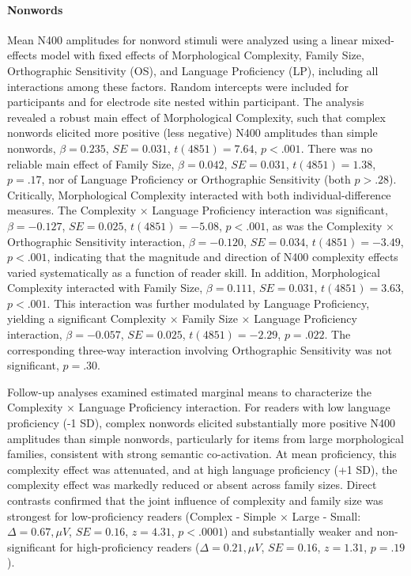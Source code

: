 \documentclass[preprint,12pt, authoryear, review]{elsarticle}
\begin{document}
	\paragraph*{Nonwords}
	Mean N400 amplitudes for nonword stimuli were analyzed using a linear mixed-effects model with fixed effects of Morphological Complexity, Family Size, Orthographic Sensitivity (OS), and Language Proficiency (LP), including all interactions among these factors. Random intercepts were included for participants and for electrode site nested within participant. The analysis revealed a robust main effect of Morphological Complexity, such that complex nonwords elicited more positive (less negative) N400 amplitudes than simple nonwords, $\beta = 0.235$, $SE = 0.031$, $t(4851) = 7.64$, $p < .001$. There was no reliable main effect of Family Size, $\beta = 0.042$, $SE = 0.031$, $t(4851) = 1.38$, $p = .17$, nor of Language Proficiency or Orthographic Sensitivity (both $p > .28$). Critically, Morphological Complexity interacted with both individual-difference measures. The Complexity × Language Proficiency interaction was significant, $\beta = -0.127$, $SE = 0.025$, $t(4851) = -5.08$, $p < .001$, as was the Complexity × Orthographic Sensitivity interaction, $\beta = -0.120$, $SE = 0.034$, $t(4851) = -3.49$, $p < .001$, indicating that the magnitude and direction of N400 complexity effects varied systematically as a function of reader skill. In addition, Morphological Complexity interacted with Family Size, $\beta = 0.111$, $SE = 0.031$, $t(4851) = 3.63$, $p < .001$. This interaction was further modulated by Language Proficiency, yielding a significant Complexity × Family Size × Language Proficiency interaction, $\beta = -0.057$, $SE = 0.025$, $t(4851) = -2.29$, $p = .022$. The corresponding three-way interaction involving Orthographic Sensitivity was not significant, $p = .30$.
	
	Follow-up analyses examined estimated marginal means to characterize the Complexity × Language Proficiency interaction. For readers with low language proficiency (-1 SD), complex nonwords elicited substantially more positive N400 amplitudes than simple nonwords, particularly for items from large morphological families, consistent with strong semantic co-activation. At mean proficiency, this complexity effect was attenuated, and at high language proficiency (+1 SD), the complexity effect was markedly reduced or absent across family sizes. Direct contrasts confirmed that the joint influence of complexity and family size was strongest for low-proficiency readers (Complex - Simple × Large - Small: $\Delta = 0.67,\mu V$, $SE = 0.16$, $z = 4.31$, $p < .0001$) and substantially weaker and non-significant for high-proficiency readers ($\Delta = 0.21,\mu V$, $SE = 0.16$, $z = 1.31$, $p = .19$).
	
\end{document}
